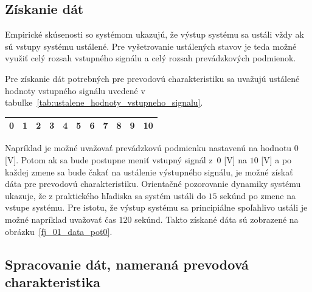 \documentclass[a4paper, 10pt, ]{article}
\begin{document}
\subsection{Získanie dát}


Empirické skúsenosti so systémom ukazujú, že výstup systému sa ustáli vždy ak sú vstupy systému ustálené. Pre vyšetrovanie ustálených stavov je teda možné využiť celý rozsah vstupného signálu a celý rozsah prevádzkových podmienok.




Pre získanie dát potrebných pre prevodovú charakteristiku sa uvažujú ustálené hodnoty vstupného signálu uvedené v tabuľke~\ref{tab:ustalene_hodnoty_vstupneho_signalu}.

\begin{center}

\vspace{-10pt}    
    
\label{tab:ustalene_hodnoty_vstupneho_signalu}

\lstyle

\begin{tabular*}{\textwidth}{@{ \extracolsep{\fill}} ccccccccccc}
\toprule
0 & 1 & 2 & 3 & 4 & 5 & 6 & 7 & 8 & 9 & 10 \\
\bottomrule
\end{tabular*}

\end{center}





Napríklad je možné uvažovať prevádzkovú podmienku nastavenú na hodnotu $0$ [V]. Potom ak sa bude postupne meniť vstupný signál z~$0$ [V] na $10$ [V] a po každej zmene sa bude čakať na ustálenie výstupného signálu, je možné získať dáta pre prevodovú charakteristiku. Orientačné pozorovanie dynamiky systému ukazuje, že z praktického hľadiska sa systém ustáli do $15$ sekúnd po zmene na vstupe systému. Pre istotu, že výstup systému sa principiálne spoľahlivo ustáli je možné napríklad uvažovať čas $120$ sekúnd. Takto získané dáta sú zobrazené na obrázku~\ref{fj_01_data_pot0}.








\subsection{Spracovanie dát, nameraná prevodová charakteristika}
\end{document}
